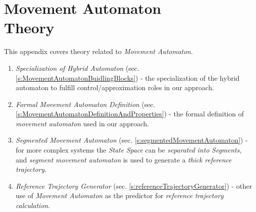 \cleardoublepage

\chapter[Movement Automaton Theory]{Movement Automaton\\ Theory}
\noindent This appendix covers theory related to \emph{Movement Automaton}.

\begin{enumerate}
	\item \emph{Specialization of Hybrid Automaton} (sec. \ref{s:MovementAutomatonBuidlingBlocks}) - the specialization of the hybrid automaton to fulfill control/approximation roles in our approach.
	
	\item \emph{Formal Movement Automaton Definition} (sec. \ref{s:MovementAutomatonDefinitionAndProperties}) - the formal definition of \emph{movement automaton} used in our approach.
    
    \item \emph{Segmented Movement Automaton} (sec. \ref{s:segmentedMovementAutomaton}) - for more complex systems the \emph{State Space} can be \emph{separated into Segments}, and \emph{segment movement automaton} is used to generate a \emph{thick reference trajectory}.
    
    \item \emph{Reference Trajectory Generator} (sec. \ref{s:referenceTrajectoryGenerator}) - other use of \emph{Movement Automaton} as the predictor for \emph{reference trajectory calculation}.
\end{enumerate}